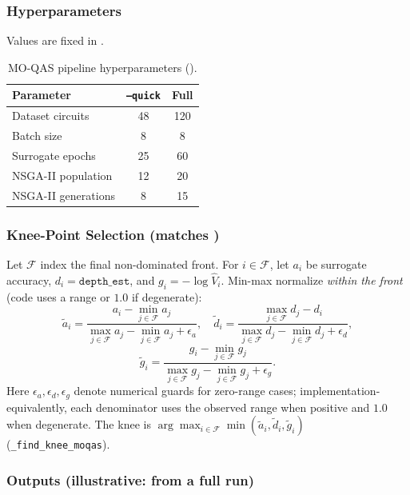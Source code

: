 \subsubsection{Hyperparameters}

Values are fixed in .

\begin{table}[t]
  \centering
  \caption{MO-QAS pipeline hyperparameters ().}
  \label{tab:moqas_hyper}
  \begin{tabular}{lcc}
    \toprule
    Parameter & \texttt{--quick} & Full \\
    \midrule
    Dataset circuits & 48 & 120 \\
    Batch size & 8 & 8 \\
    Surrogate epochs & 25 & 60 \\
    NSGA-II population & 12 & 20 \\
    NSGA-II generations & 8 & 15 \\
    \bottomrule
  \end{tabular}
\end{table}

\subsubsection{Knee-Point Selection (matches )}

Let $\mathcal{F}$ index the final non-dominated front.
For $i\in\mathcal{F}$, let $a_i$ be surrogate accuracy, $d_i=\texttt{depth\_est}$,
and $g_i=-\log \hat V_i$.
Min-max normalize \emph{within the front} (code uses a range or $1.0$ if
degenerate):
\[
  \tilde a_i = \frac{a_i - \min_{j\in\mathcal F}a_j}{\max_{j\in\mathcal F}a_j - \min_{j\in\mathcal F}a_j + \epsilon_a},\quad
  \tilde d_i = \frac{\max_{j\in\mathcal F}d_j - d_i}{\max_{j\in\mathcal F}d_j - \min_{j\in\mathcal F}d_j + \epsilon_d},
\]
\[
  \tilde g_i = \frac{g_i - \min_{j\in\mathcal F}g_j}{\max_{j\in\mathcal F}g_j - \min_{j\in\mathcal F}g_j + \epsilon_g}.
\]
Here $\epsilon_a,\epsilon_d,\epsilon_g$ denote numerical guards for zero-range
cases; implementation-equivalently, each denominator uses the observed range when
positive and $1.0$ when degenerate.
The knee is $\arg\max_{i\in\mathcal F}\min(\tilde a_i,\tilde d_i,\tilde g_i)$
(\texttt{\_find\_knee\_moqas}).

\subsubsection{Outputs (illustrative:  from a full run)}

